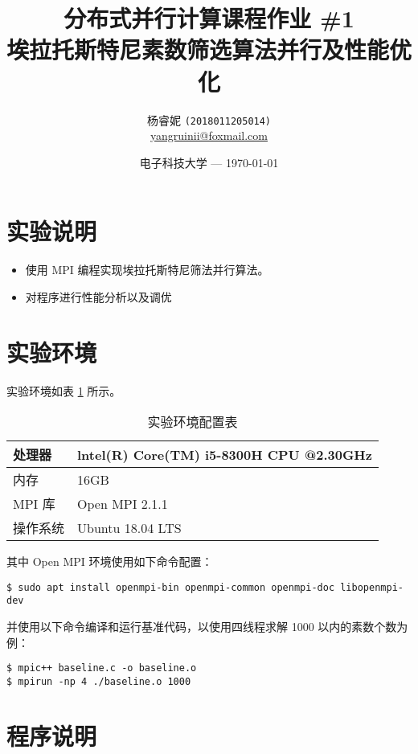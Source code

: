 \documentclass{article}
\title{\Large 分布式并行计算课程作业 \#1 \\
  \LARGE 埃拉托斯特尼素数筛选算法并行及性能优化} %
\author{杨睿妮 \texttt{(2018011205014)} \\ \url{yangruinii@foxmail.com}} %
\date{电子科技大学 --- \today} %
\begin{document}
  
  \maketitle %

  \section{实验说明}
  \begin{itemize}
    \item 使用 MPI 编程实现埃拉托斯特尼筛法并行算法。
    \item 对程序进行性能分析以及调优
  \end{itemize}

  \section{实验环境}
  实验环境如表 \ref{tab:env} 所示。
  \begin{table}[htbp]
    \centering
    \caption{实验环境配置表}
    \label{tab:env}
    \begin{tabular}{ll}
      \hline
      处理器 & lntel(R) Core(TM) i5-8300H CPU @2.30GHz \\
      \hline
      内存 & 16GB \\
      \hline
      MPI 库 & Open MPI 2.1.1\\
      \hline
      操作系统 & Ubuntu 18.04 LTS \\
      \hline
    \end{tabular}
  \end{table}
  
  其中 Open MPI 环境使用如下命令配置：
  \begin{commandline}
    \begin{verbatim}
$ sudo apt install openmpi-bin openmpi-common openmpi-doc libopenmpi-dev
    \end{verbatim}
\end{commandline}

并使用以下命令编译和运行基准代码，以使用四线程求解 1000 以内的素数个数为例：
\begin{commandline}
  \begin{verbatim}
$ mpic++ baseline.c -o baseline.o
$ mpirun -np 4 ./baseline.o 1000
  \end{verbatim}
\end{commandline}

  \section{程序说明}
\end{document}
